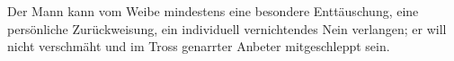 Der Mann kann vom Weibe mindestens eine besondere Enttäuschung, eine persönliche Zurückweisung, ein individuell vernichtendes Nein verlangen; er will nicht  verschmäht und im Tross genarrter Anbeter mitgeschleppt sein.
\par

